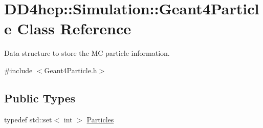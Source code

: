 \hypertarget{class_d_d4hep_1_1_simulation_1_1_geant4_particle}{}\section{D\+D4hep\+:\+:Simulation\+:\+:Geant4\+Particle Class Reference}
\label{class_d_d4hep_1_1_simulation_1_1_geant4_particle}


Data structure to store the MC particle information.  




{\ttfamily \#include $<$Geant4\+Particle.\+h$>$}

\subsection*{Public Types}
\begin{DoxyCompactItemize}
\item 
typedef std\+::set$<$ int $>$ \hyperlink{class_d_d4hep_1_1_simulation_1_1_geant4_particle_a123ad778eff51ea80ce778d54776c072}{Particles}
\end{DoxyCompactItemize}
